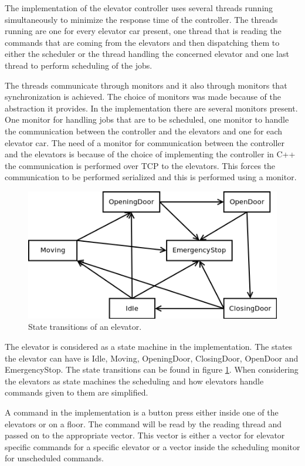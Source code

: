 \documentclass[10pt,a4paper]{article}
\begin{document}
The implementation of the elevator controller uses several threads running simultaneously to minimize the response time of the controller. The threads running are one for every elevator car present, one thread that is reading the commands that are coming from the elevators and then dispatching them to either the scheduler or the thread handling the concerned elevator and one last thread to perform scheduling of the jobs.

The threads communicate through monitors and it also through monitors that synchronization is achieved. The choice of monitors was made because of the abstraction it provides. In the implementation there are several monitors present. One monitor for handling jobs that are to be scheduled, one monitor to handle the communication between the controller and the elevators and one for each elevator car. The need of a monitor for communication between the controller and the elevators is because of the choice of implementing the controller in C++ the communication is performed over TCP to the elevators. This forces the communication to be performed serialized and this is performed using a monitor.

\begin{figure}[!h]
\centering
\includegraphics[scale=0.5]{state_transition.png}
\caption{State transitions of an elevator.}
\label{fig:states}
\end{figure}

The elevator is considered as a state machine in the implementation. The states the elevator can have is Idle, Moving, OpeningDoor, ClosingDoor, OpenDoor and EmergencyStop. The state transitions can be found in figure \ref{fig:states}. When considering the elevators as state machines the scheduling and how elevators handle commands given to them are simplified.

A command in the implementation is a button press either inside one of the elevators or on a floor. The command will be read by the reading thread and passed on to the appropriate vector. This vector is either a vector for elevator specific commands for a specific elevator or a vector inside the scheduling monitor for unscheduled commands.
\end{document}
